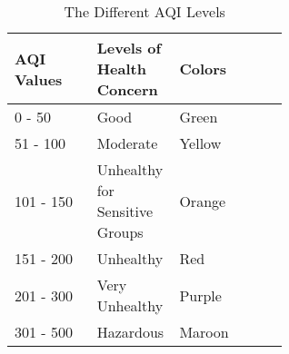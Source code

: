 
\begin{table}[H]
  \centering
  \caption{The Different AQI Levels \cite{aqi-technical-doc}}
  \begin{tabularx}{\linewidth}{|p{0.3\linewidth}|p{0.3\linewidth}|X|}
    \hline
    \rowcolor[HTML]{\lightblue}
    AQI Values & Levels of Health Concern & Colors
    \\\hline\hline

    \rowcolor[HTML]{00E400}
    0 - 50 & Good & Green
    \\\hline

    \rowcolor[HTML]{FFFF00}
    51 - 100 & Moderate & Yellow
    \\\hline

    \rowcolor[HTML]{FF7E00}
    101 - 150 & Unhealthy for Sensitive Groups & Orange
    \\\hline

    \rowcolor[HTML]{FF0000}
    151 - 200 & Unhealthy & Red
    \\\hline

    \rowcolor[HTML]{\purple}
    201 - 300 & Very Unhealthy & Purple
    \\\hline

    \rowcolor[HTML]{\maroon}
    301 - 500 & Hazardous & Maroon
    \\\hline

  \end{tabularx}
  \label{tab:aqi-levels}
\end{table}


